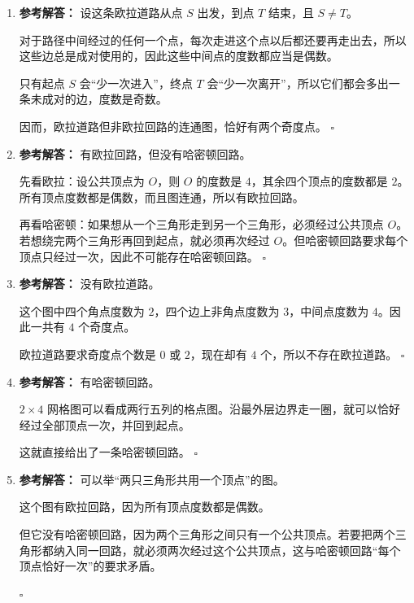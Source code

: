 \documentclass[11pt,a4paper,fontset=fandol]{ctexart}
\newenvironment{solution}{\par\noindent\textbf{参考解答：}}{\hfill$\square$\par}
\begin{document}
\begin{enumerate}
  \item \begin{solution}
  设这条欧拉道路从点 $S$ 出发，到点 $T$ 结束，且 $S\neq T$。

  对于路径中间经过的任何一个点，每次走进这个点以后都还要再走出去，所以这些边总是成对使用的，因此这些中间点的度数都应当是偶数。

  只有起点 $S$ 会“少一次进入”，终点 $T$ 会“少一次离开”，所以它们都会多出一条未成对的边，度数是奇数。

  因而，欧拉道路但非欧拉回路的连通图，恰好有两个奇度点。
  \end{solution}

  \item \begin{solution}
  有欧拉回路，但没有哈密顿回路。

  先看欧拉：设公共顶点为 $O$，则 $O$ 的度数是 $4$，其余四个顶点的度数都是 $2$。所有顶点度数都是偶数，而且图连通，所以有欧拉回路。

  再看哈密顿：如果想从一个三角形走到另一个三角形，必须经过公共顶点 $O$。若想绕完两个三角形再回到起点，就必须再次经过 $O$。但哈密顿回路要求每个顶点只经过一次，因此不可能存在哈密顿回路。
  \end{solution}

  \item \begin{solution}
  没有欧拉道路。

  这个图中四个角点度数为 $2$，四个边上非角点度数为 $3$，中间点度数为 $4$。因此一共有 $4$ 个奇度点。

  欧拉道路要求奇度点个数是 $0$ 或 $2$，现在却有 $4$ 个，所以不存在欧拉道路。
  \end{solution}

  \item \begin{solution}
  有哈密顿回路。

  $2\times 4$ 网格图可以看成两行五列的格点图。沿最外层边界走一圈，就可以恰好经过全部顶点一次，并回到起点。

  这就直接给出了一条哈密顿回路。
  \end{solution}

  \item \begin{solution}
  可以举“两只三角形共用一个顶点”的图。

  这个图有欧拉回路，因为所有顶点度数都是偶数。

  但它没有哈密顿回路，因为两个三角形之间只有一个公共顶点。若要把两个三角形都纳入同一回路，就必须两次经过这个公共顶点，这与哈密顿回路“每个顶点恰好一次”的要求矛盾。


\end{solution}
\end{enumerate}
\end{document}

